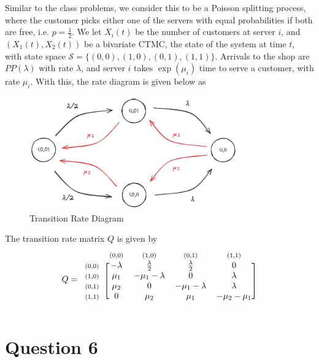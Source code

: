 \documentclass[12pt]{article}
\newcommand{\matindex}[1]{\mbox{\scriptsize#1}}%
\begin{document}
Similar to the class problems, we consider this to be a Poisson splitting process, where the customer picks either one of the servers with equal probabilities if both are free, i.e. $p = \frac{1}{2}$. We let $X_i(t)$ be the number of customers at server $i$, and $\left( X_1(t), X_2(t) \right)$ be a bivariate CTMC, the state of the system at time $t$, with state space $\mathcal{S} = \{(0,0), (1,0), (0,1), (1,1)\}$. Arrivals to the shop are $PP(\lambda)$ with rate $\lambda$, and server $i$ takes $\exp (\mu_i)$ time to serve a customer, with rate $\mu_i$. With this, the rate diagram is given below as 

\begin{figure}[H]
    \centering
    \includegraphics[width=0.8\textwidth]{Images/Q4.png}
    \caption{Transition Rate Diagram}
    \label{fig:4-diag}
\end{figure} 

\noindent The transition rate matrix $Q$ is given by \begin{equation}
    Q = \begin{blockarray}{ccccc}
        & \matindex{(0,0)} & \matindex{(1,0)} &\matindex{(0,1)} &\matindex{(1,1)} \\
        \begin{block}{c[cccc]}
            \matindex{(0,0)} & -\lambda & \frac{\lambda}{2} & \frac{\lambda}{2} & 0 \\
            \matindex{(1,0)} & \mu_1 & -\mu_{1}-\lambda  & 0 & \lambda \\
            \matindex{(0,1)} & \mu_2 & 0 & -\mu_{1}-\lambda & \lambda \\
            \matindex{(1,1)} & 0 & \mu_2 & \mu_1 & -\mu_{2}-\mu_1 \\
        \end{block}
    \end{blockarray}
\end{equation}

\section*{Question 6}
\end{document}
